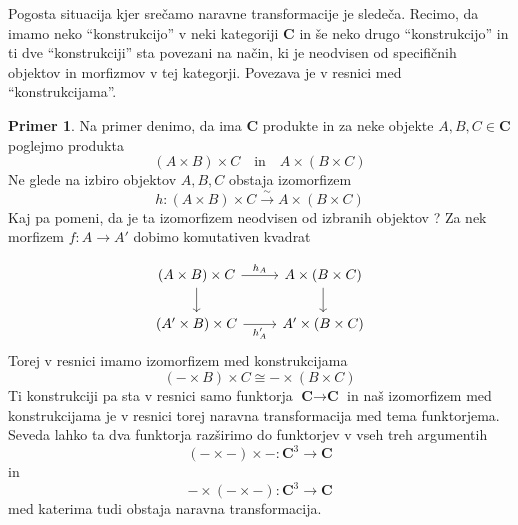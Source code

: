 \documentclass[12pt,a4paper]{book}
\theoremstyle{definition}
\theoremstyle{plain}
\theoremstyle{definition}
\newtheorem{primer}{Primer}[section]
\theoremstyle{remark}
\newcommand{\cat}[1]{\textbf{#1}}
\begin{document}
Pogosta situacija kjer srečamo naravne transformacije je sledeča. Recimo, da imamo neko "`konstrukcijo"' v neki kategoriji \cat{C} in še neko drugo "`konstrukcijo"' in ti dve "`konstrukciji"' sta povezani na način, ki je neodvisen od specifičnih objektov in morfizmov v tej kategorji. Povezava je v resnici med "`konstrukcijama"'. 
\begin{primer}
Na primer denimo, da ima \cat{C} produkte in za neke objekte $A,B,C \in \cat{C}$ poglejmo produkta
$$(A \times B) \times C \quad \text{in} \quad A \times (B \times C)$$
Ne glede na izbiro objektov $A,B,C$ obstaja izomorfizem
$$h : (A \times B) \times C \xrightarrow{\sim} A \times (B \times C)$$
Kaj pa pomeni, da je ta izomorfizem neodvisen od izbranih objektov ? Za nek morfizem $f : A \to A'$ dobimo komutativen kvadrat

$$ \begin{tikzcd}
(A \times B) \times C \ar[r, "h_A"] \ar[d] & A \times (B \times C) \ar[d] \\
(A' \times B) \times C \ar[r, "h_A'"'] & A' \times (B \times C) 
\end{tikzcd} $$
Torej v resnici imamo izomorfizem med konstrukcijama 
$$(- \times B) \times C \cong - \times (B \times C)$$
Ti konstrukciji pa sta v resnici samo funktorja $\cat{C} \to \cat{C}$ in naš izomorfizem med konstrukcijama je v resnici torej naravna transformacija med tema funktorjema. Seveda lahko ta dva funktorja razširimo do funktorjev v vseh treh argumentih
$$(- \times -) \times - : \cat{C}^3 \to \cat{C}$$
in
$$ - \times (- \times -) : \cat{C}^3 \to \cat{C}$$
med katerima tudi obstaja naravna transformacija.
\end{primer}
\end{document}
